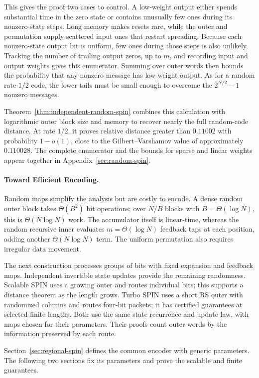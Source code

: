 This gives the proof two cases to control. A low-weight output either
spends substantial time in the zero state or contains unusually few ones
during its nonzero-state steps. Long memory makes resets rare, while the
outer and permutation supply scattered input ones that restart spreading.
Because each nonzero-state output bit is uniform, few ones during those
steps is also unlikely.
Tracking the number of trailing output zeros, up to $m$, and recording
input and output weights gives this enumerator. Summing over outer words
then bounds the probability that any nonzero message has low-weight output.
As for a random rate-$1/2$ code, the lower tails must be small enough to
overcome the $2^{N/2}-1$ nonzero messages.

Theorem~\ref{thm:independent-random-spin} combines this calculation with
logarithmic outer block size and memory to recover nearly the full
random-code distance. At rate $1/2$, it proves relative
distance greater than $0.11002$ with probability $1-o(1)$, close to the
Gilbert--Varshamov value of approximately $0.110028$. The complete enumerator and
the bounds for sparse and linear weights appear together in
Appendix~\ref{sec:random-spin}.

\paragraph{Toward Efficient Encoding.}
Random maps simplify the analysis but are costly to encode.
A dense random outer block takes $\Theta(B^2)$ bit operations;
over $N/B$ blocks with $B=\Theta(\log N)$, this is $\Theta(N\log N)$ work.
The accumulator itself is linear-time, whereas the random recursive inner
evaluates $m=\Theta(\log N)$ feedback taps at each position, adding another
$\Theta(N\log N)$ term. The uniform permutation also requires irregular
data movement.

The next construction processes groups of bits with fixed expansion and
feedback maps. Independent invertible state updates provide the remaining
randomness. Scalable SPIN uses a growing outer and routes individual bits;
this supports a distance theorem as the length grows. Turbo SPIN uses a
short RS outer with randomized columns and routes four-bit packets; it has
certified guarantees at selected finite lengths. Both use the same state
recurrence and update law, with maps chosen for their parameters. Their
proofs count outer words by the information preserved by each route.

Section~\ref{sec:regional-spin} defines the common encoder with generic
parameters. The following two sections fix its parameters and prove the
scalable and finite guarantees.
